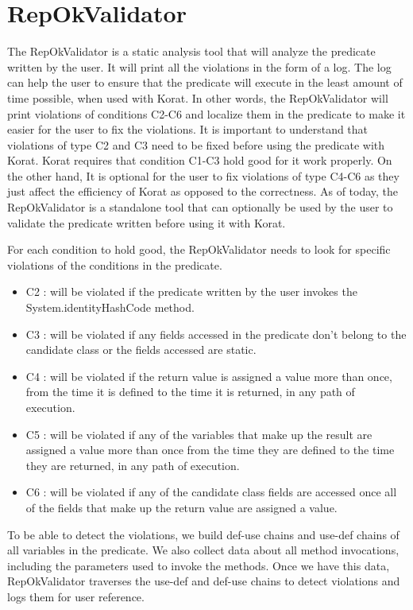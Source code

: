 \section{RepOkValidator}
The RepOkValidator is a static analysis tool that will analyze the predicate written by the user. It will print all the violations in the form of a log. The log can help the user to ensure that the predicate will execute in the least amount of time possible, when used with Korat. In other words, the RepOkValidator will print violations of conditions C2-C6 and localize them in the predicate to make it easier for the user to fix the violations. It is important to understand that violations of type C2 and C3 need to be fixed before using the predicate with Korat. Korat requires that condition C1-C3 hold good for it work properly. On the other hand, It is optional for the user to fix violations of type C4-C6 as they just affect the efficiency of Korat as opposed to the correctness. As of today, the RepOkValidator is a standalone tool that can optionally be used by the user to validate the predicate written before using it with Korat.

\par
For each condition to hold good, the RepOkValidator needs to look for specific violations of the conditions in the predicate. 
\begin{itemize}
\item C2 : will be violated if the predicate written by the user invokes the System.identityHashCode method.
\item C3 : will be violated if any fields accessed in the predicate don’t belong to the candidate class or the fields accessed are static.
\item C4 : will be violated if the return value is assigned a value more than once, from the time it is defined to the time it is returned, in any path of execution.
\item C5 : will be violated if any of the variables that make up the result are assigned a value more than once from the time they are defined to the time they are returned, in any path of execution.
\item C6 : will be violated if any of the candidate class fields are accessed once all of the fields that make up the return value are assigned a value.
\end{itemize}

\par
To be able to detect the violations, we build def-use chains and use-def chains of all variables in the predicate. We also collect data about all method invocations, including the parameters used to invoke the methods. Once we have this data, RepOkValidator traverses the use-def and def-use chains to detect violations and logs them for user reference.

